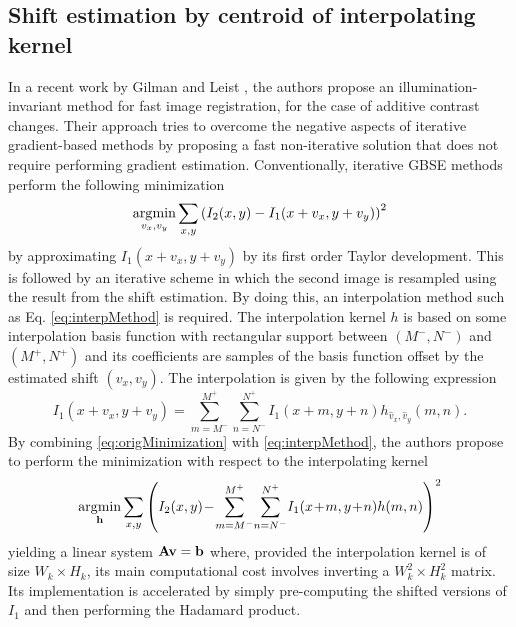 \subsection{Shift estimation by centroid of interpolating kernel}
\label{sec:interpolationMethod2013}
In a recent work by Gilman and Leist \cite{gilman_global_2013}, the authors propose an illumination-invariant method for fast image registration, for the case of additive contrast changes. Their approach tries to overcome the negative aspects of iterative gradient-based methods by proposing a fast non-iterative solution that does not require performing gradient estimation. Conventionally, iterative GBSE methods perform the following minimization 
\begin{equation}
\operatorname*{\arg\!\min}_{v_x,v_y} \sum_{x,y} \left(I_2(x,y) - I_1(x + v_x, y + v_y)\right)^2
\label{eq:origMinimization}
\end{equation}
by approximating $I_1(x + v_x, y + v_y)$ by its first order Taylor development. This is followed by an iterative scheme in which the second image is resampled using the result from the shift estimation. By doing this, an interpolation method such as Eq. \eqref{eq:interpMethod} is required. The interpolation kernel $h$ is based on some interpolation basis function with rectangular support between $(M^-,N^-)$ and $(M^+,N^+)$ and its coefficients are samples of the basis function offset by the estimated shift $(v_x,v_y)$. The interpolation is given by the following expression
\begin{equation}
\label{eq:interpMethod}
I_1(x+v_x,y+v_y) = \sum_{m=M^-}^{M^+}\sum_{n=N^-}^{N^+} I_1(x + m, y + n) h_{\hat{v}_x,\hat{v}_y}(m,n).
\end{equation}
By combining \eqref{eq:origMinimization} with \eqref{eq:interpMethod}, the authors propose to perform the minimization with respect to the interpolating kernel
\begin{equation}
\label{eq:interpEqToMin}
\argmin_{\mathbf{h}} \sum_{x,y} \left(I_2(x,y)\!-\!\sum_{m=M^-}^{M^+}\!\sum_{n=N^-}^{N^+}\!I_1(x\!+\!m, y\!+\!n) h(m,n)\right)^2
\end{equation}
yielding a linear system $\mathbf{A} \mathbf{v} = \mathbf{b}$ where, provided the interpolation kernel is of size $W_k \times H_k$, its main computational cost involves inverting a $W_k^2 \times H_k^2$ matrix.
Its implementation is accelerated by simply pre-computing the shifted versions of $I_1$ and then performing the Hadamard product.

